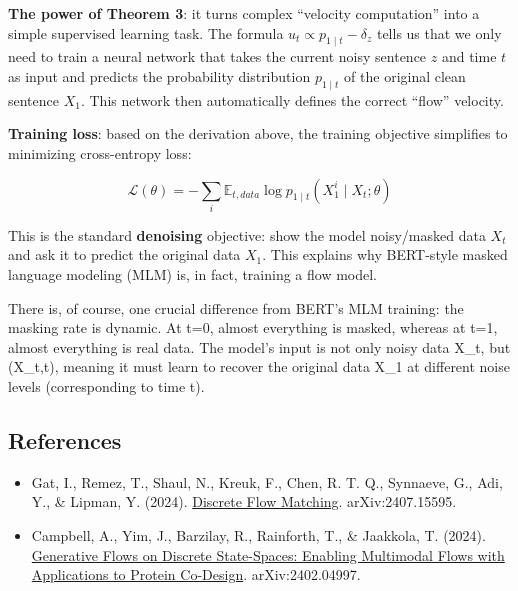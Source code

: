 \textbf{The power of Theorem 3}: it turns complex ``velocity computation'' into a simple supervised learning task. The formula \(u_t\propto p_{1\mid t}-\delta_z\) tells us that we only need to train a neural network that takes the current noisy sentence \(z\) and time \(t\) as input and predicts the probability distribution \(p_{1\mid t}\) of the original clean sentence \(X_1\). This network then automatically defines the correct ``flow'' velocity.

\textbf{Training loss}: based on the derivation above, the training objective simplifies to minimizing cross-entropy loss:

\[
\mathcal{L}(\theta)=-\sum_i\mathbb{E}_{t,data}\log p_{1\mid t}(X_1^i\mid X_t;\theta)
\]

This is the standard \textbf{denoising} objective: show the model noisy/masked data \(X_t\) and ask it to predict the original data \(X_1\). This explains why BERT-style masked language modeling (MLM) is, in fact, training a flow model.

There is, of course, one crucial difference from BERT's MLM training: the masking rate is dynamic. At t=0, almost everything is masked, whereas at t=1, almost everything is real data. The model's input is not only noisy data X\_t, but (X\_t,t), meaning it must learn to recover the original data X\_1 at different noise levels (corresponding to time t).

\FloatBarrier
{}
\hypertarget{references-136}{%
\subsection{References}\label{references-136}}

\vspace{0.25em}
\begin{itemize}
\tightlist
\item
  Gat, I., Remez, T., Shaul, N., Kreuk, F., Chen, R. T. Q., Synnaeve, G., Adi, Y., \& Lipman, Y. (2024). \href{https://arxiv.org/abs/2407.15595}{Discrete Flow Matching}. arXiv:2407.15595.
\item
  Campbell, A., Yim, J., Barzilay, R., Rainforth, T., \& Jaakkola, T. (2024). \href{https://arxiv.org/abs/2402.04997}{Generative Flows on Discrete State-Spaces: Enabling Multimodal Flows with Applications to Protein Co-Design}. arXiv:2402.04997.
\end{itemize}

\clearpage
